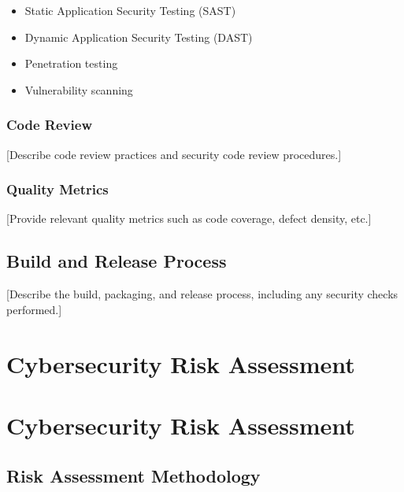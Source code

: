 \documentclass[
  11 pt,
  a4paper,
  table]{report}
\providecommand{\tightlist}{%
  \setlength{\itemsep}{0pt}\setlength{\parskip}{0pt}}\usepackage{longtable,booktabs,array}
\begin{document}
\begin{itemize}
\tightlist
\item
  Static Application Security Testing (SAST)
\item
  Dynamic Application Security Testing (DAST)
\item
  Penetration testing
\item
  Vulnerability scanning
\end{itemize}

\subsection{Code Review}\label{code-review}

{[}Describe code review practices and security code review
procedures.{]}

\subsection{Quality Metrics}\label{quality-metrics}

{[}Provide relevant quality metrics such as code coverage, defect
density, etc.{]}

\section{Build and Release Process}\label{build-and-release-process}

{[}Describe the build, packaging, and release process, including any
security checks performed.{]}


\chapter{Cybersecurity Risk
Assessment}\label{cybersecurity-risk-assessment}


\chapter{Cybersecurity Risk
Assessment}\label{cybersecurity-risk-assessment-1}

\section{Risk Assessment Methodology}\label{risk-assessment-methodology}
\end{document}
